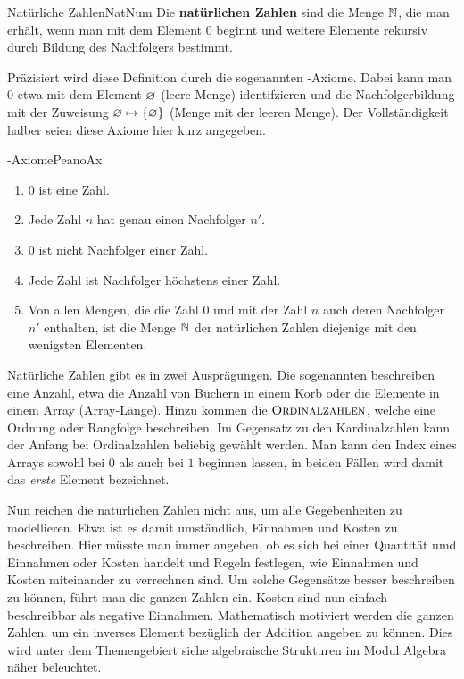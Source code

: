 \begin{definition}{Natürliche Zahlen}{NatNum}
	Die \textbf{natürlichen Zahlen} sind die Menge $\mathbb{N}$, die man erhält, wenn man mit dem Element $0$ beginnt und weitere Elemente rekursiv durch Bildung des Nachfolgers bestimmt.
\end{definition}

Präzisiert wird diese Definition durch die sogenannten -Axiome. Dabei kann man $0$ etwa mit dem Element $\varnothing$ (leere Menge) identifzieren und die Nachfolgerbildung mit der Zuweisung
$\varnothing \mapsto \lbrace \varnothing \rbrace$ (Menge mit der leeren Menge). Der Vollständigkeit halber seien diese Axiome hier kurz angegeben.

\begin{definition}{-Axiome}{PeanoAx}
	\begin{enumerate}
		\item 0 ist eine Zahl.
		\item Jede Zahl $n$ hat genau einen Nachfolger $n'$.
		\item $0$ ist nicht Nachfolger einer Zahl.
		\item Jede Zahl ist Nachfolger höchstens einer Zahl.
		\item Von allen Mengen, die die Zahl $0$ und mit der Zahl $n$ auch deren Nachfolger $n'$ enthalten, ist die Menge $\mathbb{N}$ der natürlichen Zahlen diejenige mit den wenigsten Elementen.
	\end{enumerate}
\end{definition}

Natürliche Zahlen gibt es in zwei Ausprägungen. Die sogenannten  beschreiben eine Anzahl, etwa die Anzahl von Büchern in einem Korb oder die Elemente in einem Array (Array-Länge).
Hinzu kommen die $\textsc{Ordinalzahlen}$, welche eine Ordnung oder Rangfolge beschreiben. Im Gegensatz zu den Kardinalzahlen kann der Anfang bei Ordinalzahlen beliebig gewählt werden. Man kann den Index eines
Arrays sowohl bei $0$ als auch bei $1$ beginnen lassen, in beiden Fällen wird damit das \emph{erste} Element bezeichnet.

Nun reichen die natürlichen Zahlen nicht aus, um alle Gegebenheiten zu modellieren. Etwa ist es damit umständlich, Einnahmen und Kosten zu beschreiben. Hier müsste man immer angeben, ob es sich bei einer Quantität umd Einnahmen oder Kosten handelt und Regeln festlegen, wie Einnahmen und Kosten miteinander zu verrechnen sind. Um solche Gegensätze besser beschreiben zu können, führt man die ganzen Zahlen ein.
Kosten sind nun einfach beschreibbar als negative Einnahmen. Mathematisch motiviert werden die ganzen Zahlen, um ein inverses Element bezüglich der Addition angeben zu können. Dies wird unter dem Themengebiert siehe algebraische Strukturen im Modul Algebra näher beleuchtet.

